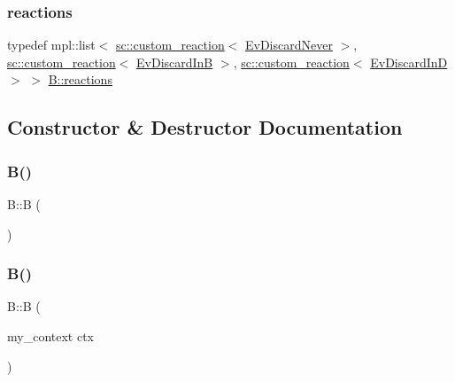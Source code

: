 \subsubsection{\texorpdfstring{reactions}{reactions}\hspace{0.1cm}{\footnotesize\ttfamily [6/6]}}
{\footnotesize\ttfamily typedef mpl\+::list$<$ \mbox{\hyperlink{classboost_1_1statechart_1_1custom__reaction}{sc\+::custom\+\_\+reaction}}$<$ \mbox{\hyperlink{struct_ev_discard_never}{Ev\+Discard\+Never}} $>$, \mbox{\hyperlink{classboost_1_1statechart_1_1custom__reaction}{sc\+::custom\+\_\+reaction}}$<$ \mbox{\hyperlink{struct_ev_discard_in_b}{Ev\+Discard\+InB}} $>$, \mbox{\hyperlink{classboost_1_1statechart_1_1custom__reaction}{sc\+::custom\+\_\+reaction}}$<$ \mbox{\hyperlink{struct_ev_discard_in_d}{Ev\+Discard\+InD}} $>$ $>$ \mbox{\hyperlink{struct_b_a2a510c568bd4f5254e154e713bcc7724}{B\+::reactions}}}



\subsection{Constructor \& Destructor Documentation}
\mbox{\label{struct_b_a9532a74021f7efb003dffbc9d4145e65}} 
\subsubsection{\texorpdfstring{B()}{B()}\hspace{0.1cm}{\footnotesize\ttfamily [1/2]}}
{\footnotesize\ttfamily B\+::B (\begin{DoxyParamCaption}{ }\end{DoxyParamCaption})\hspace{0.3cm}{\ttfamily [inline]}}

\mbox{\label{struct_b_a8d6359453d0d6206098cf1980b6c7495}} 
\subsubsection{\texorpdfstring{B()}{B()}\hspace{0.1cm}{\footnotesize\ttfamily [2/2]}}
{\footnotesize\ttfamily B\+::B (\begin{DoxyParamCaption}\item[{my\+\_\+context}]{ctx }\end{DoxyParamCaption})\hspace{0.3cm}{\ttfamily [inline]}}

